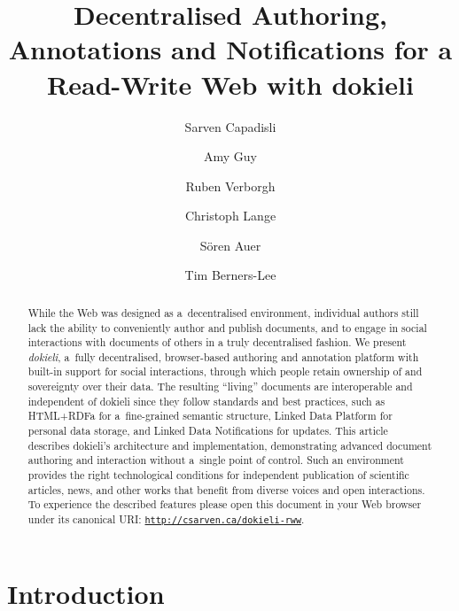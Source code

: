 \documentclass[a4paper]{llncs}
\begin{document}
\title{Decentralised Authoring, Annotations and Notifications for a Read-Write Web with dokieli}

\author{Sarven Capadisli
  \and Amy Guy
  \and Ruben Verborgh
  \and Christoph Lange
  \and Sören Auer
  \and Tim Berners-Lee}
\maketitle

\begin{abstract}
  While the Web was designed as a decentralised environment, individual authors still lack the ability to conveniently author and publish documents, and to engage in social interactions with documents of others in a truly decentralised fashion. We present \textit{dokieli}, a fully decentralised, browser-based authoring and annotation platform with built-in support for social interactions, through which people retain ownership of and sovereignty over their data. The resulting “living” documents are interoperable and independent of dokieli since they follow standards and best practices, such as HTML+RDFa for a fine-grained semantic structure, Linked Data Platform for personal data storage, and Linked Data Notifications for updates. This article describes dokieli’s architecture and implementation, demonstrating advanced document authoring and interaction without a single point of control. Such an environment provides the right technological conditions for independent publication of scientific articles, news, and other works that benefit from diverse voices and open interactions. To experience the described features please open this document in your Web browser under its canonical URI: {\tt \href{http://csarven.ca/dokieli-rww}{http://csarven.ca/dokieli-rww}}.
\end{abstract}


\section{Introduction}
\label{introduction}
\end{document}

